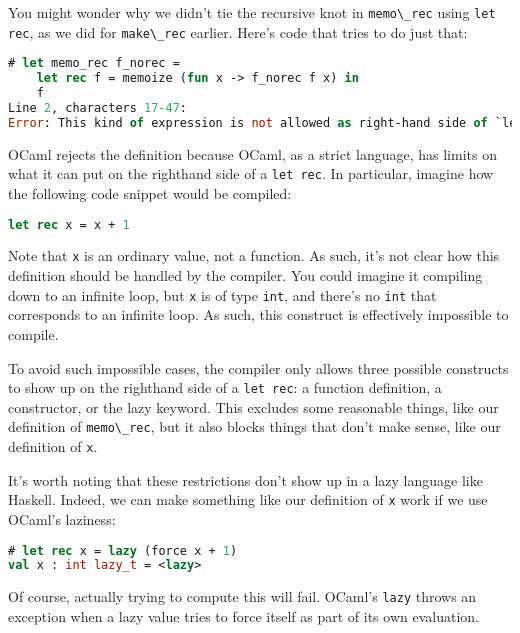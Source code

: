 You might wonder why we didn't tie the recursive knot in
\passthrough{\lstinline!memo\_rec!} using
\passthrough{\lstinline!let rec!}, as we did for
\passthrough{\lstinline!make\_rec!} earlier. Here's code that tries to
do just that: 

\begin{lstlisting}[language=Caml]
# let memo_rec f_norec =
    let rec f = memoize (fun x -> f_norec f x) in
    f
Line 2, characters 17-47:
Error: This kind of expression is not allowed as right-hand side of `let rec'
\end{lstlisting}

OCaml rejects the definition because OCaml, as a strict language, has
limits on what it can put on the righthand side of a
\passthrough{\lstinline!let rec!}. In particular, imagine how the
following code snippet would be compiled:

\begin{lstlisting}[language=Caml]
let rec x = x + 1
\end{lstlisting}

Note that \passthrough{\lstinline!x!} is an ordinary value, not a
function. As such, it's not clear how this definition should be handled
by the compiler. You could imagine it compiling down to an infinite
loop, but \passthrough{\lstinline!x!} is of type
\passthrough{\lstinline!int!}, and there's no
\passthrough{\lstinline!int!} that corresponds to an infinite loop. As
such, this construct is effectively impossible to compile.

To avoid such impossible cases, the compiler only allows three possible
constructs to show up on the righthand side of a
\passthrough{\lstinline!let rec!}: a function definition, a constructor,
or the lazy keyword. This excludes some reasonable things, like our
definition of \passthrough{\lstinline!memo\_rec!}, but it also blocks
things that don't make sense, like our definition of
\passthrough{\lstinline!x!}.

It's worth noting that these restrictions don't show up in a lazy
language like Haskell. Indeed, we can make something like our definition
of \passthrough{\lstinline!x!} work if we use OCaml's laziness:

\begin{lstlisting}[language=Caml]
# let rec x = lazy (force x + 1)
val x : int lazy_t = <lazy>
\end{lstlisting}

Of course, actually trying to compute this will fail. OCaml's
\passthrough{\lstinline!lazy!} throws an exception when a lazy value
tries to force itself as part of its own evaluation.


